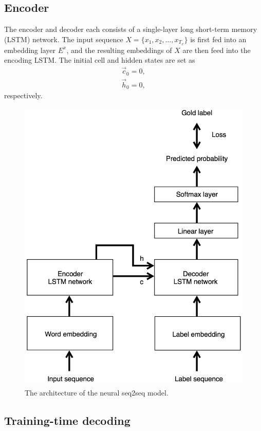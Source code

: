 \documentclass[11pt,a4paper]{article}
\begin{document}
\subsection{Encoder}

The encoder and decoder each consists of a single-layer long short-term memory (LSTM) network. The input sequence $X = \{x_1, x_2, \dots, x_{T_x}\}$ is first fed into an embedding layer $E^x$, and the resulting embeddings of $X$ are then feed into the encoding LSTM. The initial cell and hidden states are set as
\begin{align}
	\overrightarrow{c}_0 = 0, \\
	\overrightarrow{h}_0 = 0,
\end{align}
respectively.

\begin{figure}[h]
\centering
\includegraphics[width=0.8\linewidth]{fig_architecture}
\caption{The architecture of the neural seq2seq model.}
\label{fig:fig_architecture}
\end{figure}


\subsection{Training-time decoding}
\end{document}
